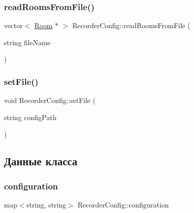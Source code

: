 \subsubsection{\texorpdfstring{read\+Rooms\+From\+File()}{readRoomsFromFile()}}
{\footnotesize\ttfamily vector$<$ \hyperlink{class_room}{Room} $\ast$ $>$ Recorder\+Config\+::read\+Rooms\+From\+File (\begin{DoxyParamCaption}\item[{string}]{file\+Name }\end{DoxyParamCaption})\hspace{0.3cm}{\ttfamily [private]}}

\mbox{\label{class_recorder_config_a50fff4cd104ffad261f37e2162aefaf8}} 
\subsubsection{\texorpdfstring{set\+File()}{setFile()}}
{\footnotesize\ttfamily void Recorder\+Config\+::set\+File (\begin{DoxyParamCaption}\item[{string}]{config\+Path }\end{DoxyParamCaption})}



\subsection{Данные класса}
\mbox{\label{class_recorder_config_a4b5b3bcc77e7477f36d5a4dec2a0ac82}} 
\subsubsection{\texorpdfstring{configuration}{configuration}}
{\footnotesize\ttfamily map$<$string, string$>$ Recorder\+Config\+::configuration\hspace{0.3cm}{\ttfamily [private]}}

\mbox{\label{class_recorder_config_ac04e6a613601514d26353c38bbcc9804}} 
